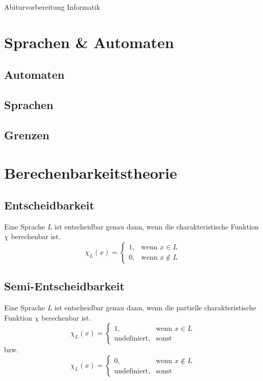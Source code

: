 \documentclass{article}
\begin{document}
\begin{titlepage}
    \begin{center}
        \Huge Abiturvorbereitung Informatik
    \end{center}
\end{titlepage}
\tableofcontents
\pagebreak
\section{Sprachen \& Automaten}
\subsection{Automaten}
\subsection{Sprachen}
\subsection{Grenzen}
\section{Berechenbarkeitstheorie}
\subsection{Entscheidbarkeit}
Eine Sprache $L$ ist entscheidbar genau dann, wenn die charakteristische Funktion $\chi$ berechenbar ist.
\begin{equation}
    \chi _L(x)=
    \begin{cases}
        1, & \text{wenn } x\in L     \\
        0, & \text{wenn } x\not\in L
    \end{cases}
\end{equation}
\subsection{Semi-Entscheidbarkeit}
Eine Sprache $L$ ist entscheidbar genau dann, wenn die partielle charakteristische Funktion $\chi$ berechenbar ist.
\begin{equation}
    \chi _L(x)=
    \begin{cases}
        1,                  & \text{wenn } x\in L \\
        \text{undefiniert}, & \text{sonst}
    \end{cases}
\end{equation}
bzw.
\begin{equation}
    \chi _L(x)=
    \begin{cases}
        0,                  & \text{wenn } x\not\in L \\
        \text{undefiniert}, & \text{sonst}
    \end{cases}
\end{equation}
\end{document}
